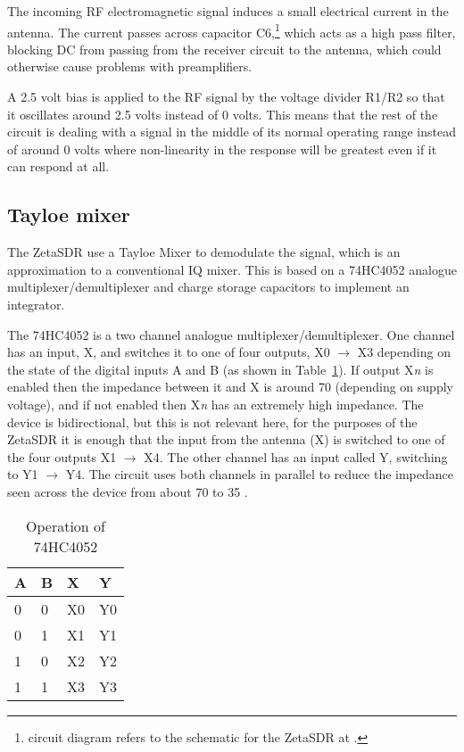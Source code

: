 \documentclass[11pt, twoside]{article}
\begin{document}
The incoming RF electromagnetic signal induces a small electrical
current in the antenna.  The current passes across capacitor
C6,\footnote{circuit diagram refers to the schematic for the ZetaSDR
  at \cite{ly1gp:2007}.} which acts as a high pass filter, blocking DC
from passing from the receiver circuit to the antenna, which could
otherwise cause problems with preamplifiers.

A 2.5 volt bias is applied to the RF signal by the voltage divider
R1/R2 so that it oscillates around 2.5 volts instead of 0 volts.  This
means that the rest of the circuit is dealing with a signal in the
middle of its normal operating range instead of around 0 volts where
non-linearity in the response will be greatest even if it can respond
at all.

\subsection{Tayloe mixer}

The ZetaSDR use a Tayloe Mixer \citep{Tayloe:2013} to demodulate the
signal, which is an approximation to a conventional IQ mixer. This is
based on a 74HC4052 analogue multiplexer/demultiplexer and charge
storage capacitors to implement an integrator.

The 74HC4052 is a two channel analogue multiplexer/demultiplexer.  One
channel has an input, X, and switches it to one of four outputs, X0
$\rightarrow$ X3 depending on the state of the digital inputs A and B
(as shown in Table~\ref{table:74HC4052}).  If output X{\it n} is
enabled then the impedance between it and X is around 70 {\ohm}
(depending on supply voltage), and if not enabled then X{\it n} has an
extremely high impedance.  The device is bidirectional, but this is
not relevant here, for the purposes of the ZetaSDR it is enough that
the input from the antenna (X) is switched to one of the four outputs
X1 $\rightarrow$ X4. The other channel has an input called Y,
switching to Y1 $\rightarrow$ Y4.  The circuit uses both channels in
parallel to reduce the impedance seen across the device from about 70
{\ohm} to 35 {\ohm}.

\begin{table}[ht]
  \center
  \begin{tabular}{|l| l| l| l|}
    \hline
    A & B & X & Y  \\
    \hline
    \hline
    0 &0& X0& Y0\\
    0 &1& X1& Y1\\
    1 &0& X2& Y2\\
    1 &1& X3& Y3\\
    \hline
  \end{tabular}
  \caption{Operation of 74HC4052}
  \label{table:74HC4052}
\end{table}
\end{document}

